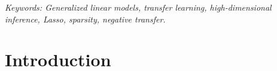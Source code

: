 \documentclass[12pt]{article}
\newcommand{\<}{\langle}
\renewcommand{\>}{\rangle}
\begin{document}
\noindent
{\it Keywords: Generalized linear models, transfer learning, high-dimensional inference, Lasso, sparsity, negative transfer.} 
\vfill

\newpage
{} %

\section{Introduction}\label{sec:intro}
\end{document}

